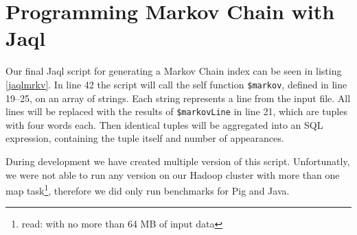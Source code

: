 \section{Programming Markov Chain with Jaql} 

Our final Jaql script for generating a Markov Chain index can be seen in listing \ref{jaqlmrkv}. In line 42 the script will call the self function \lstinline[language=jaql]!$markov!, defined in line 19--25, on an array of strings. Each string represents a line from the input file. All lines will be replaced with the results of \lstinline[language=jaql]!$markovLine! in line 21, which are tuples with four words each. Then identical tuples will be aggregated into an SQL expression, containing the tuple itself and number of appearances.       

During development we have created multiple version of this script. Unfortunatly, we were not able to run any version on our Hadoop cluster with more than one map task\footnote{read: with no more than 64 MB of input data}, therefore we did only run benchmarks for Pig and Java.